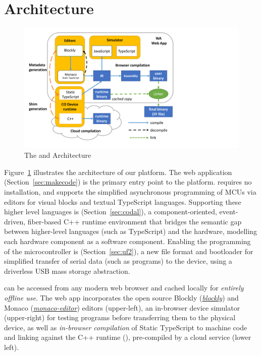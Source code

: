  \section{Architecture}

\begin{figure}[t]
    \includegraphics[width=4.8in]{makecodeFig.pdf}
\caption{\label{fig:makecode}The \MC and \CO Architecture}
\end{figure}

Figure~\ref{fig:makecode} illustrates the architecture of our platform. The \MC web application (Section~\ref{sec:makecode}) is the primary entry point to the platform. \MC requires no installation, and supports the simplified asynchronous programming of MCUs via editors for visual blocks and textual TypeScript languages. Supporting these higher level languages is \CO (Section~\ref{sec:codal}), a component-oriented, event-driven, fiber-based C++ runtime environment that bridges the semantic gap between higher-level languages (such as TypeScript) and the hardware, modelling each hardware component as a software component. Enabling the programming of the microcontroller is \UF (Section~\ref{sec:uf2}), a new file format and bootloader for simplified transfer of serial data (such as programs) to the device, using a driverless USB mass storage abstraction.

\MC can be accessed from any modern web browser and cached locally for \emph{entirely offline use}. The \MC web app incorporates the open source Blockly (\emph{\href{https://github.com/google/blockly}{blockly}}) and Monaco (\emph{\href{https://github.com/Microsoft/monaco-editor}{monaco-editor}}) editors (upper-left), an in-browser device simulator (upper-right) for testing programs before transferring them to the physical device, as well as \emph{in-browser compilation} of Static TypeScript to machine code and linking against the C++ runtime (\emph{\CON}), pre-compiled by a cloud service (lower left).

